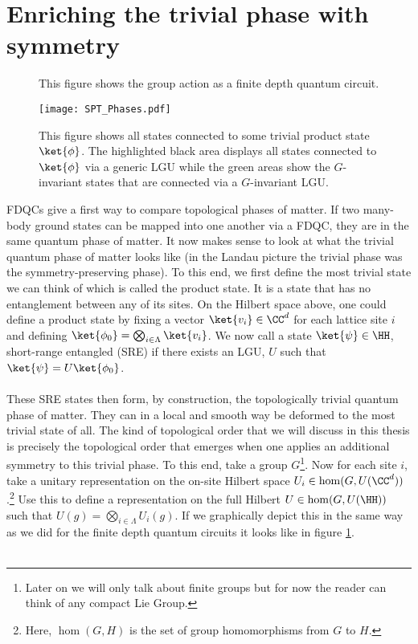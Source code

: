 \section{Enriching the trivial phase with symmetry}\label{sec:enriching-the-trivial-phase-with-symmetry}
\begin{figure}
	\centering
	\scalebox{0.9}{
		
	}
	\caption{This figure shows the group action as a finite depth quantum circuit.}
	\label{fig:GroupActionQuantumCirquit}
\end{figure}
\begin{figure}
	\centering
	\texttt{[image: SPT\_Phases.pdf]}
	\caption{This figure shows all states connected to some trivial product state $\ket{\phi}$. The highlighted black area displays all states connected to $\ket{\phi}$ via a generic LGU while the green areas show the $G$-invariant states that are connected via a $G$-invariant LGU.}
	\label{fig:ConnectedComponents}
\end{figure}
FDQCs give a first way to compare topological phases of matter. If two many-body ground states can be mapped into one another via a FDQC, they are in the same quantum phase of matter. It now makes sense to look at what the trivial quantum phase of matter looks like (in the Landau picture the trivial phase was the symmetry-preserving phase). To this end, we first define the most trivial state we can think of which is called the product state. It is a state that has no entanglement between any of its sites. On the Hilbert space above, one could define a product state by fixing a vector $\ket{v_i}\in\CC^d$ for each lattice site $i$ and defining $\ket{\phi_0}=\bigotimes_{i\in\Lambda}\ket{v_i}$. We now call a state $\ket{\psi}\in\HH$, short-range entangled (SRE) if there exists an LGU, $U$ such that $\ket{\psi}=U\ket{\phi_0}$.\\\\
These SRE states then form, by construction, the topologically trivial quantum phase of matter. They can in a local and smooth way be deformed to the most trivial state of all. The kind of topological order that we will discuss in this thesis is precisely the topological order that emerges when one applies an additional symmetry to this trivial phase. To this end, take a group $G$\footnote{Later on we will only talk about finite groups but for now the reader can think of any compact Lie Group.}. Now for each site $i$, take a unitary representation on the on-site Hilbert space $U_i\in\hom(G,U(\CC^d))$.\footnote{Here, $\hom(G,H)$ is the set of group homomorphisms from $G$ to $H$.} Use this to define a representation on the full Hilbert $U\in\hom(G,U(\HH))$ such that $U(g)=\bigotimes_{i\in\Lambda}U_i(g)$. If we graphically depict this in the same way as we did for the finite depth quantum circuits it looks like in figure \ref{fig:GroupActionQuantumCirquit}.\\\\

